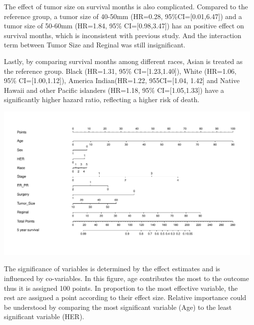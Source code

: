 \documentclass[
  12pt,
]{article}
\begin{document}
The effect of tumor size on survival months is also complicated.
Compared to the reference group, a tumor size of 40-50mm (HR=0.28,
95\%CI={[}0.01,6.47{]}) and a tumor size of 50-60mm (HR=1.84, 95\%
CI={[}0.98,3.47{]}) has an positive effect on survival months, which is
inconsistent with previous study. And the interaction term between Tumor
Size and Reginal was still insignificant.

Lastly, by comparing survival months among different races, Asian is
treated as the reference group. Black (HR=1.31, 95\%
CI={[}1.23,1.40{]}), White (HR=1.06, 95\% CI={[}1.00,1.12{]}), America
Indian(HR=1.22, 955CI={[}1.04, 1.42{]} and Native Hawaii and other
Pacific islanders (HR=1.18, 95\% CI={[}1.05,1.33{]}) have a
significantly higher hazard ratio, reflecting a higher risk of death.

\includegraphics{report_files/figure-latex/unnamed-chunk-3-1.pdf}

The significance of variables is determined by the effect estimates and
is influenced by co-variables. In this figure, age contributes the most
to the outcome thus it is assigned 100 points. In proportion to the most
effective variable, the rest are assigned a point according to their
effect size. Relative importance could be understood by comparing the
most significant variable (Age) to the least significant variable (HER).
\end{document}
